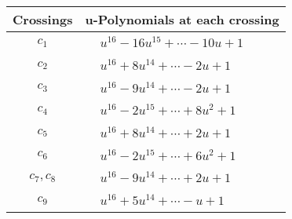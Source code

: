 \documentclass[1p]{elsarticle_modified}
\theoremstyle{definition}
\begin{document}
\begin{tabular}{m{50pt}|m{274pt}}
Crossings & \hspace{64pt}u-Polynomials at each crossing \\
\hline $$\begin{aligned}c_{1}\end{aligned}$$&$\begin{aligned}
&u^{16}-16 u^{15}+\cdots-10 u+1
\end{aligned}$\\
\hline $$\begin{aligned}c_{2}\end{aligned}$$&$\begin{aligned}
&u^{16}+8 u^{14}+\cdots-2 u+1
\end{aligned}$\\
\hline $$\begin{aligned}c_{3}\end{aligned}$$&$\begin{aligned}
&u^{16}-9 u^{14}+\cdots-2 u+1
\end{aligned}$\\
\hline $$\begin{aligned}c_{4}\end{aligned}$$&$\begin{aligned}
&u^{16}-2 u^{15}+\cdots+8 u^2+1
\end{aligned}$\\
\hline $$\begin{aligned}c_{5}\end{aligned}$$&$\begin{aligned}
&u^{16}+8 u^{14}+\cdots+2 u+1
\end{aligned}$\\
\hline $$\begin{aligned}c_{6}\end{aligned}$$&$\begin{aligned}
&u^{16}-2 u^{15}+\cdots+6 u^2+1
\end{aligned}$\\
\hline $$\begin{aligned}c_{7},c_{8}\end{aligned}$$&$\begin{aligned}
&u^{16}-9 u^{14}+\cdots+2 u+1
\end{aligned}$\\
\hline $$\begin{aligned}c_{9}\end{aligned}$$&$\begin{aligned}
&u^{16}+5 u^{14}+\cdots- u+1
\end{aligned}$\\

\end{tabular}
\end{document}
